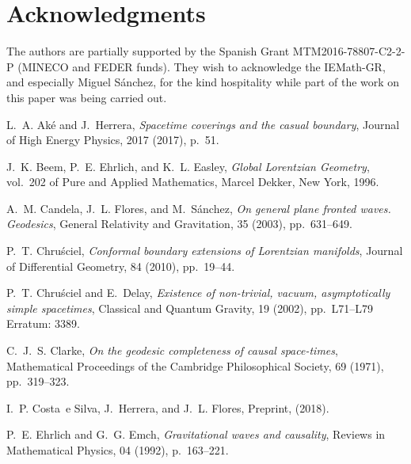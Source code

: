 \documentclass[11pt]{article}
\begin{document}






\section*{Acknowledgments}

The authors are partially supported by the Spanish Grant MTM2016-78807-C2-2-P (MINECO and FEDER funds). They wish to acknowledge the IEMath-GR, and especially Miguel S\'anchez, for the kind hospitality while part of the work on this paper was being carried out.

\begin{thebibliography}{10}

{\sc L.~A. Ak{\'e} and J.~Herrera}, {\em Spacetime coverings and the casual
  boundary}, Journal of High Energy Physics, 2017 (2017), p.~51.

{\sc J.~K. Beem, P.~E. Ehrlich, and K.~L. Easley}, {\em Global {{Lorentzian
  Geometry}}}, vol.~202 of Pure and Applied Mathematics, {Marcel Dekker}, New
  York, 1996.

{\sc A.~M. Candela, J.~L. Flores, and M.~S{\'a}nchez}, {\em On general plane
  fronted waves. {{Geodesics}}}, General Relativity and Gravitation, 35 (2003),
  pp.~631--649.

{\sc P.~T. Chru{\'s}ciel}, {\em Conformal boundary extensions of {{Lorentzian}}
  manifolds}, Journal of Differential Geometry, 84 (2010), pp.~19--44.

{\sc P.~T. Chru{\'s}ciel and E.~Delay}, {\em Existence of non-trivial, vacuum,
  asymptotically simple spacetimes}, Classical and Quantum Gravity, 19 (2002),
  pp.~L71--L79 Erratum: 3389.

{\sc C.~J.~S. Clarke}, {\em On the geodesic completeness of causal
  space-times}, Mathematical Proceedings of the Cambridge Philosophical
  Society, 69 (1971), pp.~319--323.

{\sc I.~P. Costa~e Silva, J.~Herrera, and J.~L. Flores}, Preprint,  (2018).

{\sc P.~E. Ehrlich and G.~G. Emch}, {\em Gravitational waves and causality},
  Reviews in Mathematical Physics, 04 (1992), p.~163–221.


\end{thebibliography}
\end{document}
